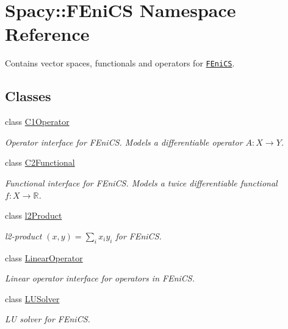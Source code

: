 \hypertarget{namespaceSpacy_1_1FEniCS}{\section{\-Spacy\-:\-:\-F\-Eni\-C\-S \-Namespace \-Reference}
\label{namespaceSpacy_1_1FEniCS}
}


\-Contains vector spaces, functionals and operators for \href{www.fenicsproject.org}{\tt \-F\-Eni\-C\-S}.  


\subsection*{\-Classes}
\begin{DoxyCompactItemize}
\item 
class \hyperlink{classSpacy_1_1FEniCS_1_1C1Operator}{\-C1\-Operator}
\begin{DoxyCompactList}\small\item\em \-Operator interface for \-F\-Eni\-C\-S. \-Models a differentiable operator $A:X\rightarrow Y$. \end{DoxyCompactList}\item 
class \hyperlink{classSpacy_1_1FEniCS_1_1C2Functional}{\-C2\-Functional}
\begin{DoxyCompactList}\small\item\em \-Functional interface for \-F\-Eni\-C\-S. \-Models a twice differentiable functional $f:X\rightarrow \mathbb{R}$. \end{DoxyCompactList}\item 
class \hyperlink{classSpacy_1_1FEniCS_1_1l2Product}{l2\-Product}
\begin{DoxyCompactList}\small\item\em l2-\/product $(x,y) = \sum_i x_i y_i $ for \-F\-Eni\-C\-S. \end{DoxyCompactList}\item 
class \hyperlink{classSpacy_1_1FEniCS_1_1LinearOperator}{\-Linear\-Operator}
\begin{DoxyCompactList}\small\item\em \-Linear operator interface for operators in \-F\-Eni\-C\-S. \end{DoxyCompactList}\item 
class \hyperlink{classSpacy_1_1FEniCS_1_1LUSolver}{\-L\-U\-Solver}
\begin{DoxyCompactList}\small\item\em \-L\-U solver for \-F\-Eni\-C\-S. \end{DoxyCompactList}\item 

\end{DoxyCompactItemize}
